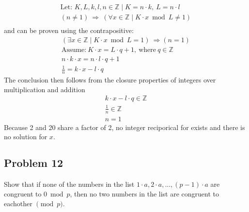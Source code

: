 \documentclass[11pt]{article}
\begin{document}
\begin{gather*}
	\textrm{Let: }K, L, k, l, n \in \mathbb{Z} \mid K = n \cdot k,\ L = n \cdot l \\
	\left(n \neq 1 \right)\ \Rightarrow \ \left ( \forall x \in \mathbb{Z} \mid K \cdot x \bmod{L} \neq 1 \right ) \\
\end{gather*}
and can be proven using the contrapositive:
\begin{gather*}
	\left ( \exists x \in \mathbb{Z} \mid K \cdot x \bmod{L} = 1 \right)\ \Rightarrow \left( n = 1 \right) \\
	\text{Assume:}\ K \cdot x = L \cdot q + 1,\ \text{where}\ q \in \mathbb{Z} \\
	n \cdot k \cdot x = n \cdot l \cdot q + 1 \\
	\frac{1}{n} = k \cdot x - l \cdot q
\end{gather*}
The conclusion then follows from the closure properties of integers over multiplication and addition
\begin{gather*}
	k \cdot x - l \cdot q \in \mathbb{Z} \\
	\frac{1}{n} \in \mathbb{Z} \\
	n = 1
\end{gather*}
Because 2 and 20 share a factor of 2, no integer reciporical for exists and there is no solution for $x$.

\subsection*{Problem 12}
\paragraph*{} 
Show that if none of the numbers in the list $1 \cdot a, 2 \cdot a, \dots, (p-1) \cdot a$
are congruent to $0 \bmod p$, then no two numbers in the list are congruent to eachother $\pmod p$.
\end{document}
